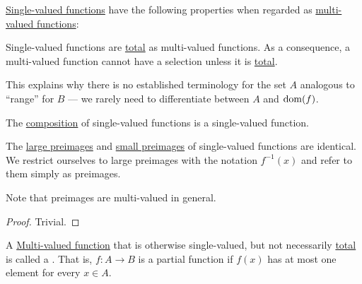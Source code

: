 \begin{proposition}\label{thm:def:function/properties}
  \hyperref[def:function]{Single-valued functions} have the following properties when regarded as \hyperref[def:multi_valued_function]{multi-valued functions}:
  \begin{thmenum}
     Single-valued functions are \hyperref[def:multi_valued_function/total]{total} as multi-valued functions. As a consequence, a multi-valued function cannot have a selection unless it is \hyperref[def:multi_valued_function/total]{total}.

    This explains why there is no established terminology for the set \( A \) analogous to \enquote{range} for \( B \) --- we rarely need to differentiate between \( A \) and \( \operatorname{dom}(f) \).

     The \hyperref[def:multi_valued_function/composition]{composition} of single-valued functions is a single-valued function.

     The \hyperref[def:multi_valued_function/large_preimage]{large preimages} and \hyperref[def:multi_valued_function/small_preimage]{small preimages} of single-valued functions are identical. We restrict ourselves to large preimages with the notation \( f^{-1}(x) \) and refer to them simply as preimages.

    Note that preimages are multi-valued in general.
  \end{thmenum}
\end{proposition}
\begin{proof}
  Trivial.
\end{proof}

\begin{definition}\label{def:partial_function}
  A \hyperref[def:multi_valued_function]{Multi-valued function} that is otherwise single-valued, but not necessarily \hyperref[def:multi_valued_function/total]{total} is called a . That is, \( f: A \to B \) is a partial function if \( f(x) \) has at most one element for every \( x \in A \).
\end{definition}

